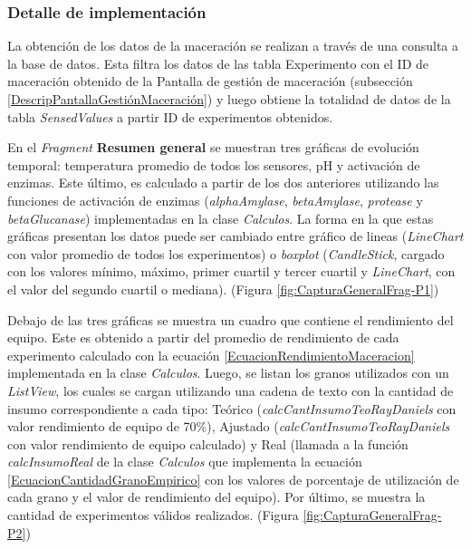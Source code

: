            \subsubsection{Detalle de implementación}
            \par La obtención de los datos de la maceración se realizan a través de una consulta a la base de datos. Esta filtra los datos de las tabla Experimento con el ID de maceración obtenido de la Pantalla de gestión de maceración (subsección \ref{DescripPantallaGestiónMaceración}) y luego obtiene la totalidad de datos de la tabla \textit{SensedValues} a partir ID de experimentos obtenidos.
            
            \par En el \textit{Fragment} \textbf{Resumen general} se muestran tres gráficas de evolución temporal: temperatura promedio de todos los sensores, pH y activación de enzimas. Este último, es calculado a partir de los dos anteriores utilizando las funciones de activación de enzimas (\textit{alphaAmylase}, \textit{betaAmylase}, \textit{protease} y \textit{betaGlucanase}) implementadas en la clase \textit{Calculos}. La forma en la que estas gráficas presentan los datos puede ser cambiado entre gráfico de lineas (\textit{LineChart} con valor promedio de todos los experimentos) o \textit{boxplot} (\textit{CandleStick}, cargado con los valores mínimo, máximo, primer cuartil y tercer cuartil y \textit{LineChart}, con el valor del segundo cuartil o mediana). (Figura \ref{fig:CapturaGeneralFrag-P1})
            
            \par Debajo de las tres gráficas se muestra un cuadro que contiene el rendimiento del equipo. Este es obtenido a partir del promedio de rendimiento de cada experimento calculado con la ecuación \ref{EcuacionRendimientoMaceracion} implementada en la clase \textit{Calculos}. Luego, se listan los granos utilizados con un \textit{ListView}, los cuales se cargan utilizando una cadena de texto con la cantidad de insumo correspondiente a cada tipo: Teórico (\textit{calcCantInsumoTeoRayDaniels} con valor rendimiento de equipo de 70\%), Ajustado (\textit{calcCantInsumoTeoRayDaniels} con valor rendimiento de equipo calculado) y Real (llamada a la función \textit{calcInsumoReal} de la clase \textit{Calculos} que implementa la ecuación  \ref{EcuacionCantidadGranoEmpirico} con los valores de porcentaje de utilización de cada grano y el valor de rendimiento del equipo). Por último, se muestra la cantidad de experimentos válidos realizados. (Figura \ref{fig:CapturaGeneralFrag-P2})
            
